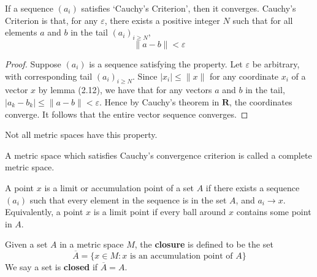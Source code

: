 \begin{theorem}
  If a sequence $(a_i)$ satisfies `Cauchy's Criterion', then it converges. Cauchy's Criterion is that, for any $\varepsilon$, there exists a positive integer $N$ such that for all elements $a$ and $b$ in the tail $(a_i)_{i \geq N}$,
  \[ \| a - b \| < \varepsilon \]
\end{theorem}
\begin{proof}
  Suppose $(a_i)$ is a sequence satisfying the property. Let $\varepsilon$ be arbitrary, with corresponding tail $(a_i)_{i \geq N}$. Since $|x_i| \leq \|x\|$ for any coordinate $x_i$ of a vector $x$ by lemma (2.12), we have that for any vectors $a$ and $b$ in the tail, $|a_k - b_k| \leq \|a - b\| < \varepsilon$. Hence by Cauchy's theorem in $\mathbf{R}$, the coordinates converge. It follows that the entire vector sequence converges.
\end{proof}

Not all metric spaces have this property.

\begin{definition}
  A metric space which satisfies Cauchy's convergence criterion is called a complete metric space.
\end{definition}

\begin{definition}
  A point $x$ is a limit or accumulation point of a set $A$ if there exists a sequence $(a_i)$ such that every element in the sequence is in the set $A$, and $a_i \to x$. Equivalently, a point $x$ is a limit point if every ball around $x$ contains some point in $A$.
\end{definition}

\begin{definition}
  Given a set $A$ in a metric space $M$, the {\bf closure} is defined to be the set
  \[ \overline{A} = \{ x \in M : \text{$x$ is an accumulation point of $A$} \} \]
  We say a set is {\bf closed} if $\overline{A} = A$.
\end{definition}

